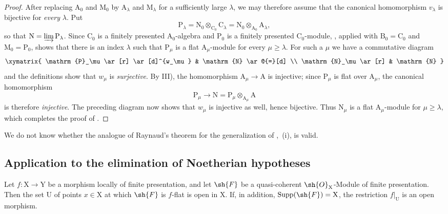 \begin{proof}
After replacing $\mathrm{A}_0$ and $\mathrm{M}_0$ by
$\mathrm{A}_\lambda$ and $\mathrm{M}_\lambda$ for a sufficiently large
$\lambda$, we may therefore assume that the canonical homomorphism
$v_\lambda$ is bijective for \emph{every} $\lambda$. Put
\[
  \mathrm{P}_\lambda
  =\mathrm{N}_0\otimes_{\mathrm{C}_0}\mathrm{C}_\lambda
  =\mathrm{N}_0\otimes_{\mathrm{A}_0}\mathrm{A}_\lambda,
\]
so that $\mathrm{N}=\varinjlim\mathrm{P}_\lambda$. Since
$\mathrm{C}_0$ is a finitely presented $\mathrm{A}_0$-algebra and
$\mathrm{P}_0$ is a finitely presented $\mathrm{C}_0$-module,
, applied with
$\mathrm{B}_0=\mathrm{C}_0$ and $\mathrm{M}_0=\mathrm{P}_0$, shows that
there is an index $\lambda$ such that $\mathrm{P}_\mu$ is a flat
$\mathrm{A}_\mu$-module for every $\mu\geqslant\lambda$. For such a
$\mu$ we have a commutative diagram
\[
\xymatrix{
  \mathrm{P}_\mu \ar[r] \ar[d]^{w_\mu} & \mathrm{N} \ar@{=}[d] \\
  \mathrm{N}_\mu \ar[r] & \mathrm{N}
}
\]
and the definitions show that $w_\mu$ is \emph{surjective}. By III), the
homomorphism $\mathrm{A}_\mu\to\mathrm{A}$ is injective; since
$\mathrm{P}_\mu$ is flat over $\mathrm{A}_\mu$, the canonical
homomorphism
\[
  \mathrm{P}_\mu\longrightarrow
  \mathrm{N}
  =\mathrm{P}_\mu\otimes_{\mathrm{A}_\mu}\mathrm{A}
\]
is therefore \emph{injective}. The preceding diagram now shows that
$w_\mu$ is injective as well, hence bijective. Thus
$\mathrm{N}_\mu$ is a flat $\mathrm{A}_\mu$-module for
$\mu\geqslant\lambda$, which completes the proof of
.
\end{proof}

\begin{remark}[11.2.10]
\label{IV.11.2.10}
We do not know whether the analogue of Raynaud's theorem for the
generalization of ,~(i), is valid.
\end{remark}

\subsection{Application to the elimination of Noetherian hypotheses}
\label{subsection:IV.11.3}


\begin{theorem}[11.3.1]
\label{IV.11.3.1}
Let $f:\mathrm{X}\to\mathrm{Y}$ be a morphism locally of finite
presentation, and let $\sh{F}$ be a quasi-coherent
$\sh{O}_\mathrm{X}$-Module of finite presentation. Then the set
$\mathrm{U}$ of points $x\in\mathrm{X}$ at which $\sh{F}$ is
$f$-flat is open in $\mathrm{X}$. If, in addition,
$\operatorname{Supp}(\sh{F})=\mathrm{X}$, the restriction
$f|_\mathrm{U}$ is an open morphism.
\end{theorem}

